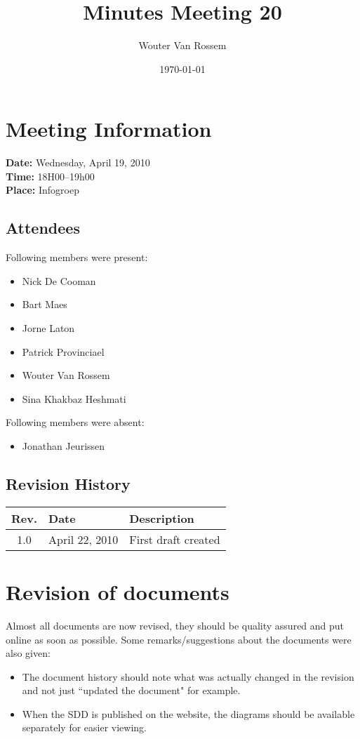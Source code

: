 \documentclass[a4paper, 12pt]{article}
\begin{document}
\title{Minutes Meeting 20}
\author{Wouter Van Rossem}
\date{\today}

\maketitle	
	\section{Meeting Information}
		\textbf{Date:} Wednesday, April 19, 2010\\
		\textbf{Time:} 18H00--19h00\\
		\textbf{Place:} Infogroep\\
		\subsection{Attendees}
Following members were present:
			\begin{itemize}
				\item Nick De Cooman				
				\item Bart Maes
				\item Jorne Laton
				\item Patrick Provinciael
				\item Wouter Van Rossem
				\item Sina Khakbaz Heshmati
			\end{itemize}
Following members were absent:
			\begin{itemize}
			 	\item Jonathan Jeurissen
			\end{itemize}
			
		\subsection{Revision History}
			\begin{tabular}{c | l | l }
				\textbf{Rev.} & \textbf{Date} & \textbf{Description} \\
				\hline
				1.0 & April 22, 2010 & First draft created \\
			\end{tabular}		

	\section{Revision of documents}
		Almost all documents are now revised, they should be quality assured and put online as soon as possible. Some remarks/suggestions about the documents were also given:
		\begin{itemize}
			 \item The document history should note what was actually changed in the revision and not just ``updated the document" for example.	
			 \item When the SDD is published on the website, the diagrams should be available separately for easier viewing.	
		\end{itemize}
		
\end{document}
